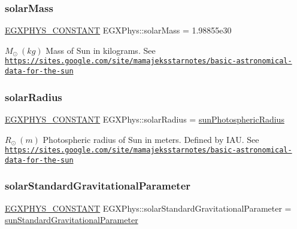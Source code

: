 \subsubsection{\texorpdfstring{solar\+Mass}{solarMass}}
{\footnotesize\ttfamily \mbox{\hyperlink{group___e_g_x_phys-_constants-_macros_ga76980d288494ce1714c9ac68a95ba702}{E\+G\+X\+P\+H\+Y\+S\+\_\+\+C\+O\+N\+S\+T\+A\+NT}} E\+G\+X\+Phys\+::solar\+Mass = 1.\+98855e30}

$M_{\odot} \ (kg)$ Mass of Sun in kilograms. See \href{https://sites.google.com/site/mamajeksstarnotes/basic-astronomical-data-for-the-sun}{\tt https\+://sites.\+google.\+com/site/mamajeksstarnotes/basic-\/astronomical-\/data-\/for-\/the-\/sun} \mbox{\label{group___e_g_x_phys-_constants-_astrophysics-_solar_system-_sun-_bulk_gaa98fc533653b96e0ae42262027723d6c}} 
\subsubsection{\texorpdfstring{solar\+Radius}{solarRadius}}
{\footnotesize\ttfamily \mbox{\hyperlink{group___e_g_x_phys-_constants-_macros_ga76980d288494ce1714c9ac68a95ba702}{E\+G\+X\+P\+H\+Y\+S\+\_\+\+C\+O\+N\+S\+T\+A\+NT}} E\+G\+X\+Phys\+::solar\+Radius = \mbox{\hyperlink{group___e_g_x_phys-_constants-_astrophysics-_solar_system-_sun-_bulk_gac257be308fa17adaf47f3310c5c65377}{sun\+Photospheric\+Radius}}}

$ R_{\odot} \ (m)$ Photospheric radius of Sun in meters. Defined by I\+AU. See \href{https://sites.google.com/site/mamajeksstarnotes/basic-astronomical-data-for-the-sun}{\tt https\+://sites.\+google.\+com/site/mamajeksstarnotes/basic-\/astronomical-\/data-\/for-\/the-\/sun} \mbox{\label{group___e_g_x_phys-_constants-_astrophysics-_solar_system-_sun-_bulk_gaa3846a73b10df493a64f08114333d67c}} 
\subsubsection{\texorpdfstring{solar\+Standard\+Gravitational\+Parameter}{solarStandardGravitationalParameter}}
{\footnotesize\ttfamily \mbox{\hyperlink{group___e_g_x_phys-_constants-_macros_ga76980d288494ce1714c9ac68a95ba702}{E\+G\+X\+P\+H\+Y\+S\+\_\+\+C\+O\+N\+S\+T\+A\+NT}} E\+G\+X\+Phys\+::solar\+Standard\+Gravitational\+Parameter = \mbox{\hyperlink{group___e_g_x_phys-_constants-_astrophysics-_solar_system-_sun-_bulk_ga17d411dceb8d2ff98b8a270eaa72117d}{sun\+Standard\+Gravitational\+Parameter}}}

